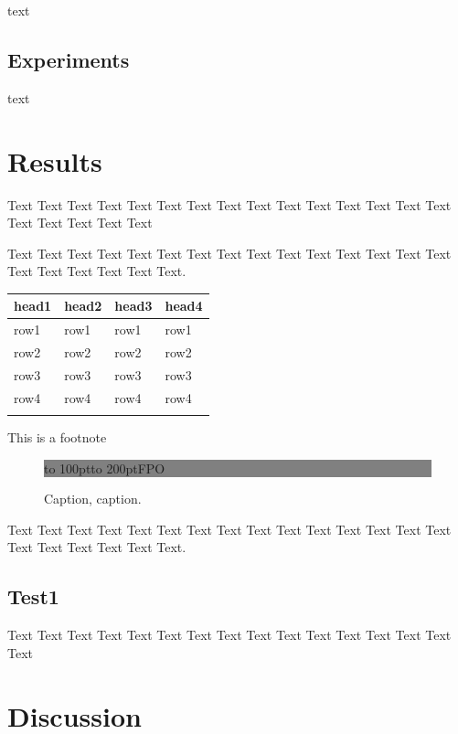 \documentclass{bioinfo}
\begin{document}
text

\subsection{Experiments}

text

\section{Results}

Text Text Text Text Text Text  Text Text Text Text Text Text Text
Text Text  Text Text Text Text Text

\enlargethispage{6pt}

Text Text Text Text Text Text  Text Text Text Text Text Text Text
Text Text  Text Text Text Text Text Text.

\begin{table}[!t]
 {\begin{tabular}{@{}llll@{}}\toprule head1 &
head2 & head3 & head4\\\midrule
row1 & row1 & row1 & row1\\
row2 & row2 & row2 & row2\\
row3 & row3 & row3 & row3\\
row4 & row4 & row4 & row4\\\botrule
\end{tabular}}{This is a footnote}
\end{table}


\begin{figure}[!tpb]%
\fboxsep=0pt\colorbox{gray}{\begin{minipage}[t]{200pt} \vbox to 100pt{\vfill\hbox to
200pt{\hfill\fontsize{24pt}{24pt}\selectfont FPO\hfill}\vfill}
\end{minipage}}
\caption{Caption, caption.}\label{fig:02}
\end{figure}

Text Text Text Text Text Text  Text Text Text Text Text Text Text
Text Text  Text Text Text Text Text Text.


\subsection{Test1}

Text Text Text Text Text Text  Text Text Text Text Text Text Text
Text Text  Text

\section{Discussion}
\end{document}
